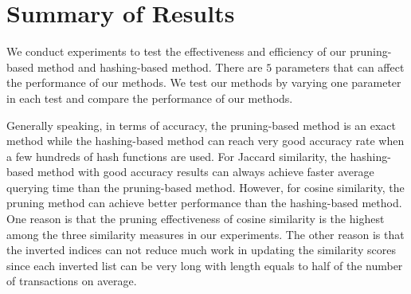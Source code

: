 
\section{Summary of Results}
We conduct experiments to test the effectiveness and efficiency of our pruning-based method and hashing-based method. There are $5$ parameters that can affect the performance of our methods. We test our methods by varying one parameter in each test and compare the performance of our methods. 

Generally speaking, in terms of accuracy, the pruning-based method is an exact method while the hashing-based method can reach very good accuracy rate when a few hundreds of hash functions are used. For Jaccard similarity, the hashing-based method with good accuracy results can always achieve faster average querying time than the pruning-based method. However, for cosine similarity, the pruning method can achieve better performance than the hashing-based method. One reason is that the pruning effectiveness of cosine similarity is the highest among the three similarity measures in our experiments. The other reason is that the inverted indices can not reduce much work in updating the similarity scores since each inverted list can be very long with length equals to half of the number of transactions on average. 








